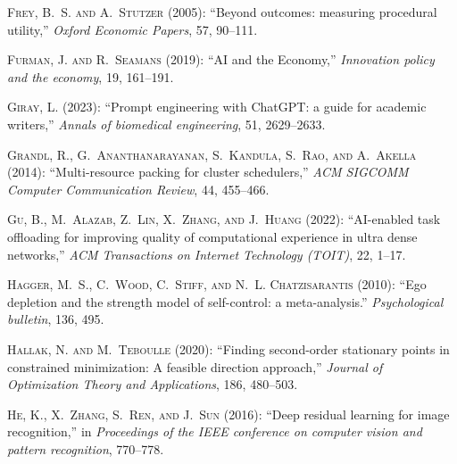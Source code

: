 \begin{thebibliography}{1}
\textsc{Frey, B.~S. and A.~Stutzer} (2005): \enquote{Beyond outcomes: measuring procedural utility,} \emph{Oxford Economic Papers}, 57, 90--111.

\textsc{Furman, J. and R.~Seamans} (2019): \enquote{AI and the Economy,} \emph{Innovation policy and the economy}, 19, 161--191.

\textsc{Giray, L.} (2023): \enquote{Prompt engineering with ChatGPT: a guide for academic writers,} \emph{Annals of biomedical engineering}, 51, 2629--2633.

\textsc{Grandl, R., G.~Ananthanarayanan, S.~Kandula, S.~Rao, and A.~Akella} (2014): \enquote{Multi-resource packing for cluster schedulers,} \emph{ACM SIGCOMM Computer Communication Review}, 44, 455--466.

\textsc{Gu, B., M.~Alazab, Z.~Lin, X.~Zhang, and J.~Huang} (2022): \enquote{AI-enabled task offloading for improving quality of computational experience in ultra dense networks,} \emph{ACM Transactions on Internet Technology (TOIT)}, 22, 1--17.

\textsc{Hagger, M.~S., C.~Wood, C.~Stiff, and N.~L. Chatzisarantis} (2010): \enquote{Ego depletion and the strength model of self-control: a meta-analysis.} \emph{Psychological bulletin}, 136, 495.

\textsc{Hallak, N. and M.~Teboulle} (2020): \enquote{Finding second-order stationary points in constrained minimization: A feasible direction approach,} \emph{Journal of Optimization Theory and Applications}, 186, 480--503.

\textsc{He, K., X.~Zhang, S.~Ren, and J.~Sun} (2016): \enquote{Deep residual learning for image recognition,} in \emph{Proceedings of the IEEE conference on computer vision and pattern recognition}, 770--778.


\end{thebibliography}
